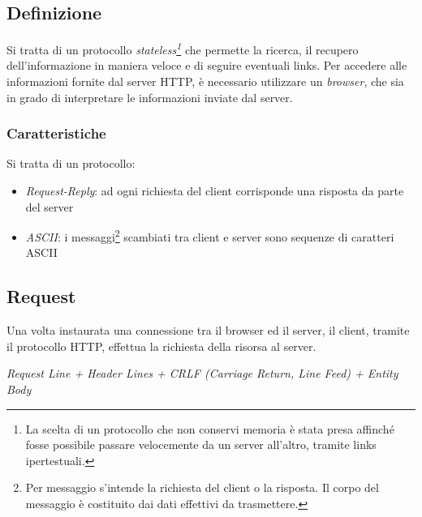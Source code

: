 \documentclass[a4paper,11pt]{article}
\begin{document}
\subsection{Definizione}
Si tratta di un protocollo \textit{stateless\footnote{La scelta di un protocollo che non conservi memoria è stata presa affinché fosse possibile passare velocemente da un server all’altro, tramite links ipertestuali.}} che permette la ricerca, il recupero dell’informazione in maniera veloce e di seguire eventuali links.\newline
Per accedere alle informazioni fornite dal server HTTP, è necessario utilizzare un \textit{browser}, che sia in grado di interpretare le informazioni inviate dal server.
\subsubsection{Caratteristiche}
Si tratta di un protocollo:
\begin{itemize}
    \item \textit{Request-Reply}: ad ogni richiesta del client corrisponde una risposta da parte del server
    \item \textit{ASCII}: i messaggi\footnote{Per messaggio s’intende la richiesta del client o la risposta. Il corpo del messaggio è costituito dai dati effettivi da trasmettere.} scambiati tra client e server sono sequenze di caratteri ASCII
\end{itemize}
\subsection{Request}
Una volta instaurata una connessione tra il browser ed il server, il client, tramite il protocollo HTTP, effettua la richiesta della risorsa al server.\bigbreak
\centerline{\textit{Request Line + Header Lines + CRLF (Carriage Return, Line Feed) + Entity Body}}
\end{document}
